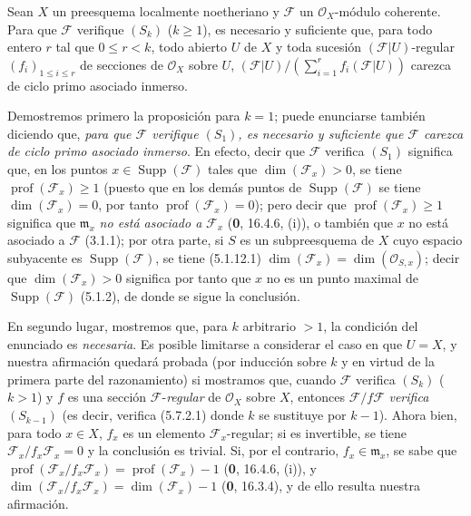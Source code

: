 \begin{proposition}[5.7.5]
\label{IV.2.s5.7.5-fr}
Sean $X$ un preesquema localmente noetheriano y $\mathscr F$ un
$\mathcal O_X$-módulo coherente. Para que $\mathscr F$ verifique $(S_k)$
($k\geq1$), es necesario y suficiente que, para todo entero $r$ tal que
$0\leq r<k$, todo abierto $U$ de $X$ y toda sucesión
$(\mathscr F|U)$-regular $(f_i)_{1\leq i\leq r}$ de secciones de
$\mathcal O_X$ sobre $U$,
$(\mathscr F|U)/(\sum_{i=1}^r f_i(\mathscr F|U))$
carezca de ciclo primo asociado inmerso.
\end{proposition}

Demostremos primero la proposición para $k=1$; puede enunciarse también
diciendo que, \emph{para que $\mathscr F$ verifique $(S_1)$, es necesario y suficiente
que $\mathscr F$ carezca de ciclo primo asociado inmerso}. En efecto, decir que
$\mathscr F$ verifica $(S_1)$ significa que, en los puntos
$x\in\operatorname{Supp}(\mathscr F)$ tales que $\dim(\mathscr F_x)>0$, se
tiene $\operatorname{prof}(\mathscr F_x)\geq1$ (puesto que en los demás puntos
de $\operatorname{Supp}(\mathscr F)$ se tiene $\dim(\mathscr F_x)=0$, por
tanto $\operatorname{prof}(\mathscr F_x)=0$); pero decir que
$\operatorname{prof}(\mathscr F_x)\geq1$ significa que $\mathfrak m_x$
\emph{no está asociado a} $\mathscr F_x$ (\textbf 0, 16.4.6, (i)), o también que $x$
no está asociado a $\mathscr F$ (3.1.1); por otra parte, si $S$ es un
subpreesquema de $X$ cuyo espacio subyacente es
$\operatorname{Supp}(\mathscr F)$, se tiene (5.1.12.1)
$\dim(\mathscr F_x)=\dim(\mathcal O_{S,x})$; decir que
$\dim(\mathscr F_x)>0$ significa por tanto que $x$ no es un punto maximal de
$\operatorname{Supp}(\mathscr F)$ (5.1.2), de donde se sigue la conclusión.

En segundo lugar, mostremos que, para $k$ arbitrario $>1$, la condición del
enunciado es \emph{necesaria}. Es posible limitarse a considerar el caso en que $U=X$,
y nuestra afirmación quedará probada (por inducción sobre $k$ y en virtud de la
primera parte del razonamiento) si mostramos que, cuando $\mathscr F$ verifica
$(S_k)$ ($k>1$) y $f$ es una sección $\mathscr F$-\emph{regular} de
$\mathcal O_X$ sobre $X$, entonces $\mathscr F/f\mathscr F$ \emph{verifica}
$(S_{k-1})$ (es decir, verifica (5.7.2.1) donde $k$ se sustituye por $k-1$).
Ahora bien, para todo $x\in X$, $f_x$ es un elemento
$\mathscr F_x$-regular; si es invertible, se tiene
$\mathscr F_x/f_x\mathscr F_x=0$ y la conclusión es trivial. Si, por el
contrario, $f_x\in\mathfrak m_x$, se sabe que
$\operatorname{prof}(\mathscr F_x/f_x\mathscr F_x)
=\operatorname{prof}(\mathscr F_x)-1$ (\textbf 0, 16.4.6, (i)), y
$\dim(\mathscr F_x/f_x\mathscr F_x)=\dim(\mathscr F_x)-1$ (\textbf 0, 16.3.4), y
de ello resulta nuestra afirmación.

